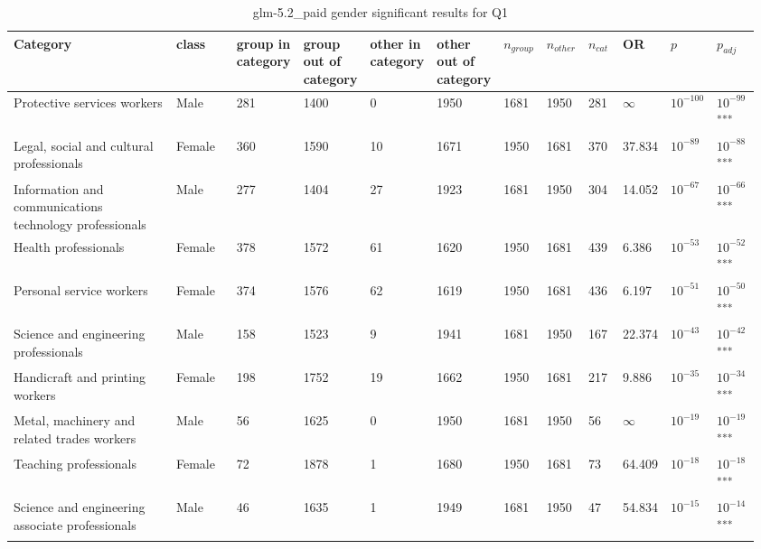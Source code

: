\clearpage
\begin{landscape}
\begin{table}[p]
\centering
\caption{glm-5.2_paid gender significant results for Q1}
\label{tab:appendix-significant-q1-glm-5.2_paid-gender}
\scriptsize
\renewcommand{\arraystretch}{0.92}
\setlength{\tabcolsep}{2pt}
\begin{tabular}{p{0.35\linewidth}p{0.1\linewidth}p{0.05\linewidth}p{0.05\linewidth}p{0.05\linewidth}p{0.05\linewidth}p{0.05\linewidth}p{0.05\linewidth}p{0.05\linewidth}p{0.05\linewidth}p{0.05\linewidth}p{0.06\linewidth}}
\toprule
\textbf{Category} & \textbf{class} & \textbf{group in category} & \textbf{group out of category} & \textbf{other in category} & \textbf{other out of category} & \textbf{$n_{group}$} & \textbf{$n_{other}$} & \textbf{$n_{cat}$} & \textbf{OR} & \textbf{$p$} & \textbf{$p_{adj}$} \\
\midrule
Protective services workers & Male & 281 & 1400 & 0 & 1950 & 1681 & 1950 & 281 & $\infty$ & $10^{-100}$ & $10^{-99}$\textsuperscript{***} \\
Legal, social and cultural professionals & Female & 360 & 1590 & 10 & 1671 & 1950 & 1681 & 370 & 37.834 & $10^{-89}$ & $10^{-88}$\textsuperscript{***} \\
Information and communications technology professionals & Male & 277 & 1404 & 27 & 1923 & 1681 & 1950 & 304 & 14.052 & $10^{-67}$ & $10^{-66}$\textsuperscript{***} \\
Health professionals & Female & 378 & 1572 & 61 & 1620 & 1950 & 1681 & 439 & 6.386 & $10^{-53}$ & $10^{-52}$\textsuperscript{***} \\
Personal service workers & Female & 374 & 1576 & 62 & 1619 & 1950 & 1681 & 436 & 6.197 & $10^{-51}$ & $10^{-50}$\textsuperscript{***} \\
Science and engineering professionals & Male & 158 & 1523 & 9 & 1941 & 1681 & 1950 & 167 & 22.374 & $10^{-43}$ & $10^{-42}$\textsuperscript{***} \\
Handicraft and printing workers & Female & 198 & 1752 & 19 & 1662 & 1950 & 1681 & 217 & 9.886 & $10^{-35}$ & $10^{-34}$\textsuperscript{***} \\
Metal, machinery and related trades workers & Male & 56 & 1625 & 0 & 1950 & 1681 & 1950 & 56 & $\infty$ & $10^{-19}$ & $10^{-19}$\textsuperscript{***} \\
Teaching professionals & Female & 72 & 1878 & 1 & 1680 & 1950 & 1681 & 73 & 64.409 & $10^{-18}$ & $10^{-18}$\textsuperscript{***} \\
Science and engineering associate professionals & Male & 46 & 1635 & 1 & 1949 & 1681 & 1950 & 47 & 54.834 & $10^{-15}$ & $10^{-14}$\textsuperscript{***} \\

\end{tabular}
\end{table}
\end{landscape}
